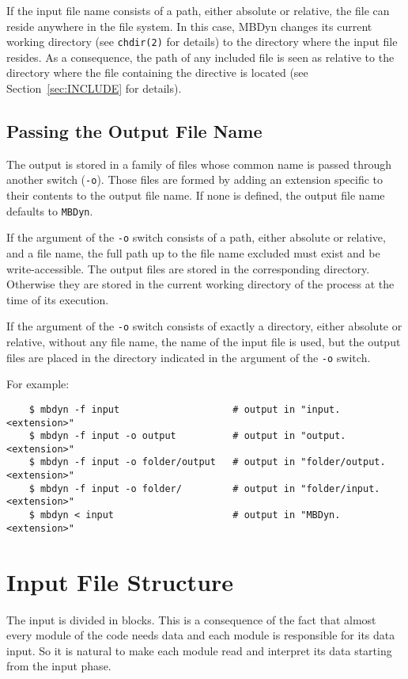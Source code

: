 If the input file name consists of a path, either absolute or relative,
the file can reside anywhere in the file system.
In this case, MBDyn changes its current working directory
(see \texttt{chdir(2)} for details)
to the directory where the input file resides.
As a consequence, the path of any included file is seen as relative
to the directory where the file containing the  directive
is located (see Section~\ref{sec:INCLUDE} for details).



\subsection{Passing the Output File Name}
The output is stored in a family of files whose common name is passed
through another switch (\texttt{-o}).
Those files are formed by adding an extension specific to their contents
to the output file name.
If none is defined, the output file name defaults to \texttt{MBDyn}.

If the argument of the \texttt{-o} switch consists of a path,
either absolute or relative, and a file name,
the full path up to the file name excluded must exist and be write-accessible.
The output files are stored in the corresponding directory.
Otherwise they are stored in the current working directory of the process
at the time of its execution.

If the argument of the \texttt{-o} switch consists of exactly a directory,
either absolute or relative, without any file name,
the name of the input file is used,
but the output files are placed in the directory indicated in the argument
of the \texttt{-o} switch.

For example:
\begin{verbatim}
    $ mbdyn -f input                    # output in "input.<extension>"
    $ mbdyn -f input -o output          # output in "output.<extension>"
    $ mbdyn -f input -o folder/output   # output in "folder/output.<extension>"
    $ mbdyn -f input -o folder/         # output in "folder/input.<extension>"
    $ mbdyn < input                     # output in "MBDyn.<extension>"
\end{verbatim}



\section{Input File Structure}
The input is divided in blocks.
This is a consequence of the fact that almost every module of the code
needs data and each module is responsible for its data input.
So it is natural to make each module read and interpret its data starting
from the input phase.


